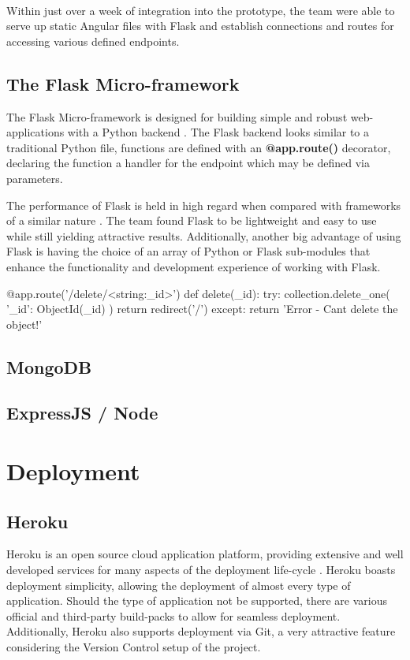 \paragraph{}
Within just over a week of integration into the prototype, the team were able to serve up static Angular files with Flask and establish connections and routes for accessing various defined endpoints.

\subsection{The Flask Micro-framework}
The Flask Micro-framework is designed for building simple and robust web-applications with a Python backend \cite{FLASK}. The Flask backend looks similar to a traditional Python file, functions are defined with an \textbf{@app.route()} decorator, declaring the function a handler for the endpoint which may be defined via parameters.

The performance of Flask is held in high regard when compared with frameworks of a similar nature \cite{FLASK_USAGE}. The team found Flask to be lightweight and easy to use while still yielding attractive results. Additionally, another big advantage of using Flask is having the choice of an array of Python or Flask sub-modules that enhance the functionality and development experience of working with Flask. 

\begin{python}[caption=Sample Route Definition with Flask]
@app.route('/delete/<string:_id>')
def delete(_id):
    try: 
        collection.delete_one( {'_id': ObjectId(_id) } ) 
        return redirect('/')
    except:
        return 'Error - Cant delete the object!'
\end{python}

\subsection{MongoDB}
\subsection{ExpressJS / Node}

\section{Deployment}
\subsection{Heroku}
Heroku is an open source cloud application platform, providing extensive and well developed services for many aspects of the deployment life-cycle \cite{HEROKU}. Heroku boasts deployment simplicity, allowing the deployment of almost every type of application. Should the type of application not be supported, there are various official and third-party build-packs to allow for seamless deployment. Additionally, Heroku also supports deployment via Git, a very attractive feature considering the Version Control setup of the project.

